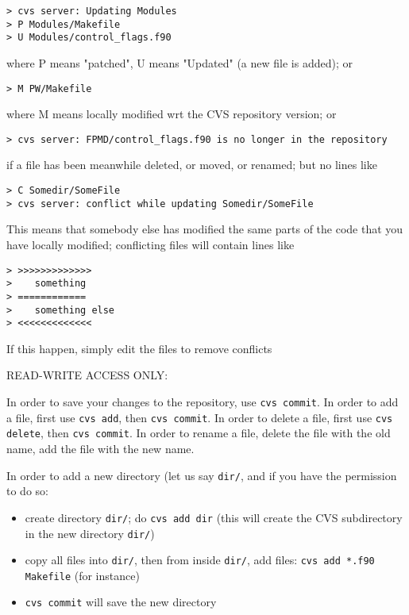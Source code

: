 \documentclass[12pt]{article}
\begin{document}
\begin{verbatim}
> cvs server: Updating Modules
> P Modules/Makefile
> U Modules/control_flags.f90
\end{verbatim}

where P means "patched", U means "Updated" (a new file is added); or

\begin{verbatim}
> M PW/Makefile
\end{verbatim}

where M means locally modified wrt the CVS repository version; or

\begin{verbatim}
> cvs server: FPMD/control_flags.f90 is no longer in the repository
\end{verbatim}

if a file has been meanwhile deleted, or moved, or renamed; but no lines like
 
\begin{verbatim}
> C Somedir/SomeFile
> cvs server: conflict while updating Somedir/SomeFile
\end{verbatim}

This means that somebody else has modified the same parts of the code 
that you have locally modified; conflicting files will contain lines like

\begin{verbatim}
> >>>>>>>>>>>>>
>    something
> ============
>    something else
> <<<<<<<<<<<<<
\end{verbatim}

If this happen, simply edit the files to remove conflicts

READ-WRITE ACCESS ONLY:

In order to save your changes to the repository, use
{\tt cvs commit}. In order to add a file, first use
{\tt cvs add}, then {\tt cvs commit}. In order to delete
a file, first use {\tt cvs delete}, then {\tt cvs commit}.
In order to rename a file, delete the file with the old
name, add the file with the new name.

In order to add a new directory (let us say {\tt dir/}, 
and if you have the permission to do so:
\begin{itemize}
\item create directory {\tt dir/}; do {\tt cvs add dir} (this
will create the CVS subdirectory in the new directory {\tt dir/})
\item 
copy all files into {\tt dir/}, then from inside {\tt dir/}, add files:
{\tt cvs add *.f90 Makefile} (for instance)
\item
{\tt cvs commit} will save the new directory
\end{itemize}
\end{document}

